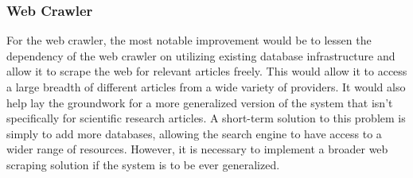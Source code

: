 \documentclass[12pt]{article}
\begin{document}
	\subsubsection{Web Crawler}
	\quad For the web crawler, the most notable improvement would be to lessen the dependency of the web crawler on utilizing existing database infrastructure and allow it to scrape the web for relevant articles freely. This would allow it to access a large breadth of different articles from a wide variety of providers. It would also help lay the groundwork for a more generalized version of the system that isn’t specifically for scientific research articles. A short-term solution to this problem is simply to add more databases, allowing the search engine to have access to a wider range of resources. However, it is necessary to implement a broader web scraping solution if the system is to be ever generalized.
\end{document}
